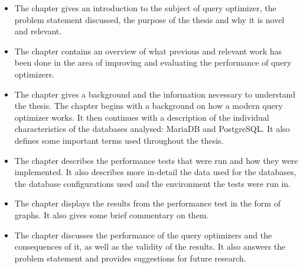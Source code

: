 \begin{itemize}
    \item The  chapter gives an introduction to the subject of query optimizer, the problem statement discussed, the purpose of the thesis and why it is novel and relevant.
    \item The  chapter contains an overview of what previous and relevant work has been done in the area of improving and evaluating the performance of query optimizers.
    \item The  chapter gives a background and the information necessary to understand the thesis. The chapter begins with a background on how a modern query optimizer works. It then continues with a description of the individual characteristics of the databases analysed: MariaDB and PostgreSQL. It also defines some important terms used throughout the thesis.
    \item The  chapter describes the performance tests that were run and how they were implemented. It also describes more in-detail the data used for the databases, the database configurations used and the environment the tests were run in.
    \item The  chapter displays the results from the performance test in the form of graphs. It also gives some brief commentary on them.
    \item The  chapter discusses the performance of the query optimizers and the consequences of it, as well as the validity of the results. It also answers the problem statement and provides suggestions for future research.
\end{itemize}